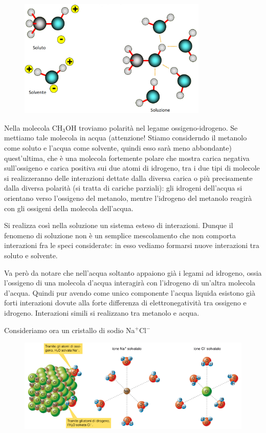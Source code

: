 \begin{figure}[htp]
    \centering
    \includegraphics[width=9cm]{immagini/acido_acetico.png}
\end{figure}

Nella molecola CH$_3$OH troviamo polarità nel legame ossigeno-idrogeno. Se mettiamo tale molecola in acqua (attenzione! Stiamo considerndo il metanolo come soluto e l'acqua come solvente, quindi esso sarà meno abbondante) quest'ultima, che è una molecola fortemente polare che mostra carica negativa sull'ossigeno e carica positiva sui due atomi di idrogeno, tra i due tipi di molecole si realizzeranno delle interazioni dettate dalla diversa carica o più precisamente dalla diversa polarità (si tratta di cariche parziali): gli idrogeni dell'acqua si orientano verso l'ossigeno del metanolo, mentre l'idrogeno del metanolo reagirà con gli ossigeni della molecola dell'acqua.

Si realizza così nella soluzione un sistema esteso di interazioni. Dunque il fenomeno di soluzione non è un semplice mescolamento che non comporta interazioni fra le speci considerate: in esso vediamo formarsi nuove interazioni tra soluto e solvente.

Va però da notare che nell'acqua soltanto appaiono già i legami ad idrogeno, ossia l'ossigeno di una molecola d'acqua interagirà con l'idrogeno di un'altra molecola d'acqua. Quindi pur avendo come unico componente l'acqua liquida esistono già forti interazioni dovute alla forte differenza di elettronegatività tra ossigeno e idrogeno. Interazioni simili si realizzano tra metanolo e acqua.

\vspace{0.2cm} Consideriamo ora un cristallo di sodio Na$^+$Cl$^-$

\begin{figure}[htp]
    \centering
    \includegraphics[width=12cm]{immagini/solvatazione_cloruro_di_sodio.png}
\end{figure}

